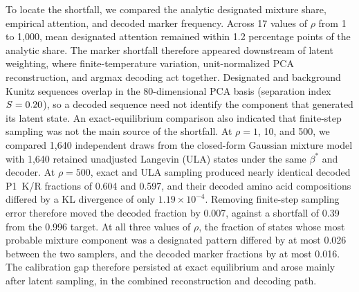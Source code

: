 To locate the shortfall, we compared the analytic designated mixture share, empirical attention,
and decoded marker frequency. Across 17 values of $\rho$ from 1 to 1{,}000, mean designated
attention remained within 1.2 percentage points of the analytic share. The marker shortfall
therefore appeared downstream of latent weighting, where finite-temperature variation,
unit-normalized PCA reconstruction, and argmax decoding act together. Designated and background Kunitz sequences overlap in the
80-dimensional PCA basis (separation index $S=0.20$), so a decoded sequence need
not identify the component that generated its latent state. An exact-equilibrium comparison also
indicated that finite-step sampling was not the main source of the shortfall. At $\rho = 1$, 10,
and 500, we compared 1{,}640 independent draws from the
closed-form Gaussian mixture model with 1{,}640 retained unadjusted Langevin (ULA) states under
the same $\beta^{*}$ and decoder. At $\rho=500$, exact and ULA sampling produced nearly
identical decoded P1~K/R fractions of 0.604 and 0.597, and their decoded amino acid compositions differed by a KL
divergence of only $1.19\times10^{-4}$. Removing finite-step sampling error therefore moved the
decoded fraction by 0.007, against a shortfall of 0.39 from the 0.996 target. At all three values
of $\rho$, the fraction of states whose most probable mixture component was a designated
pattern differed by at most 0.026 between the two samplers, and the decoded marker fractions by
at most 0.016. The calibration gap therefore persisted at exact equilibrium and arose mainly
after latent sampling, in the combined reconstruction and decoding path.

\DisplayMultiplicity

